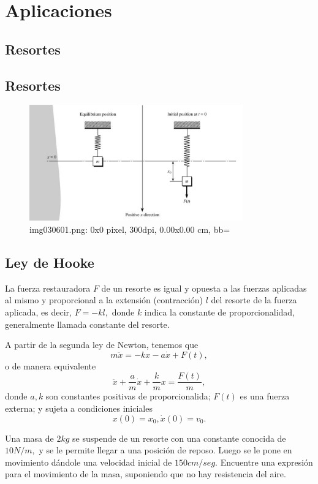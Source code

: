  \section{Aplicaciones}

\subsection{Resortes}


\subsection{Resortes}
\begin{figure}
	\centering
	\includegraphics[height=5cm,keepaspectratio=true]{./edo/img030601.png}
	img030601.png: 0x0 pixel, 300dpi, 0.00x0.00 cm, bb=
	\label{fig:030601}
\end{figure}




\subsection{Ley de Hooke}
La fuerza restauradora $F$ de un resorte es igual y opuesta a las fuerzas aplicadas al mismo y proporcional a la extensi\'on (contracci\'on) $l$ del resorte de la fuerza aplicada, es decir, $F=-kl,$ donde $k$ indica la constante de proporcionalidad, generalmente llamada constante del resorte.



A partir de la segunda ley de Newton, tenemos que $$m\ddot{x}=-kx-a\dot{x}+F(t),$$ o de manera equivalente
\[
	\label{bron:14.1}
	\ddot{x}+\dfrac{a}{m}\dot{x}+\dfrac{k}{m}x=\dfrac{F(t)}{m},
\]
donde $a,k$ son constantes positivas de proporcionalida; $F(t)$ es una fuerza externa; y sujeta a condiciones iniciales
\[
	\label{bron:14.2}
	x(0)=x_{0}, \dot{x}(0)=v_{0}.
\]




\begin{resuelto}
	\label{bron:exmp:14.2}
	Una masa de $2kg$ se suspende de un resorte con una constante conocida de $10N/m,$ y se le permite llegar a una posici\'on de reposo. Luego se le pone en movimiento dándole una velocidad inicial de $150cm/seg.$ Encuentre una expresi\'on para el movimiento de la masa, suponiendo que no hay resistencia del aire.
\end{resuelto}




